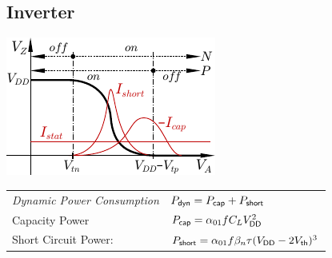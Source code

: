 \begin{sectionbox}
	\subsection{Inverter}
	\begin{center}
		\includegraphics[width = 0.6\columnwidth]{./img/char_inverter.pdf}
	\end{center}
	\begin{tabular}{ll}
		\emph{Dynamic Power Consumption} & $P_{\sf dyn} = P_{\sf cap} + P_{\sf short}$\\
		Capacity Power & $P_{\sf cap} = \alpha_{01} f C_L V_{\sf DD}^2$\\
		Short Circuit Power:	& $P_{\sf short} = \alpha_{01} f \beta_n \tau (V_{\sf DD} - 2V_{\sf th})^3$\\
	\end{tabular}\\	
\end{sectionbox}


